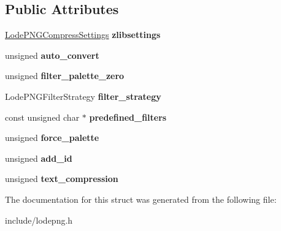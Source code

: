 \subsection*{Public Attributes}
\begin{DoxyCompactItemize}
\item 
\hyperlink{struct_lode_p_n_g_compress_settings}{Lode\+P\+N\+G\+Compress\+Settings} {\bfseries zlibsettings}\hypertarget{struct_lode_p_n_g_encoder_settings_a2c5928b4172c75e27de467870f2ff946}{}\label{struct_lode_p_n_g_encoder_settings_a2c5928b4172c75e27de467870f2ff946}

\item 
unsigned {\bfseries auto\+\_\+convert}\hypertarget{struct_lode_p_n_g_encoder_settings_a1203b8db6532c9ff4a5c8ee692cd327a}{}\label{struct_lode_p_n_g_encoder_settings_a1203b8db6532c9ff4a5c8ee692cd327a}

\item 
unsigned {\bfseries filter\+\_\+palette\+\_\+zero}\hypertarget{struct_lode_p_n_g_encoder_settings_a0d82e8f2fabcb6cebbc54b80922945f1}{}\label{struct_lode_p_n_g_encoder_settings_a0d82e8f2fabcb6cebbc54b80922945f1}

\item 
Lode\+P\+N\+G\+Filter\+Strategy {\bfseries filter\+\_\+strategy}\hypertarget{struct_lode_p_n_g_encoder_settings_a5e18e4eb941763a2e3e6c65ee9f0729c}{}\label{struct_lode_p_n_g_encoder_settings_a5e18e4eb941763a2e3e6c65ee9f0729c}

\item 
const unsigned char $\ast$ {\bfseries predefined\+\_\+filters}\hypertarget{struct_lode_p_n_g_encoder_settings_a4446f87b5283f25664802a1be037e76e}{}\label{struct_lode_p_n_g_encoder_settings_a4446f87b5283f25664802a1be037e76e}

\item 
unsigned {\bfseries force\+\_\+palette}\hypertarget{struct_lode_p_n_g_encoder_settings_a04dc9622ccd1d7c74c56291409aa512a}{}\label{struct_lode_p_n_g_encoder_settings_a04dc9622ccd1d7c74c56291409aa512a}

\item 
unsigned {\bfseries add\+\_\+id}\hypertarget{struct_lode_p_n_g_encoder_settings_a893aa542aa7c122c32ee36dd716fbcb2}{}\label{struct_lode_p_n_g_encoder_settings_a893aa542aa7c122c32ee36dd716fbcb2}

\item 
unsigned {\bfseries text\+\_\+compression}\hypertarget{struct_lode_p_n_g_encoder_settings_a6ffdcb8e85a65ea208fe027be072d710}{}\label{struct_lode_p_n_g_encoder_settings_a6ffdcb8e85a65ea208fe027be072d710}

\end{DoxyCompactItemize}


The documentation for this struct was generated from the following file\+:\begin{DoxyCompactItemize}
\item 
include/lodepng.\+h\end{DoxyCompactItemize}
